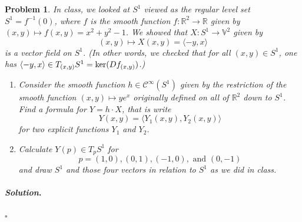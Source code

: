 \documentclass[reqno]{amsart}
\theoremstyle{plain}
\newtheorem{problem}{Problem}
\theoremstyle{definition}
\newenvironment{solution}{\paragraph{\emph{Solution}.}}{\hfill$\square$}
\begin{document}
\begin{problem}
In class, we looked at $S^{1}$ viewed as the regular level set $S^{1} = f^{-1}(0)$, where $f$ is the smooth function $f:\mathbb{R}^{2} \rightarrow \mathbb{R}$ given by $(x,y) \mapsto f(x,y) = x^{2} + y^{2}  - 1$.  We showed that $X:S^{1} \rightarrow \mathbb{V}^{2}$ given by
$$(x,y) \mapsto X(x,y) = \langle -y, x \rangle $$
is a vector field on $S^{1}$.  (In other words, we checked that for all $(x,y) \in S^{1}$, one has $\langle -y,x \rangle \in T_{(x,y)}S^{1} = {\rm ker}( Df_{(x,y)})$.)
\begin{enumerate}
\item Consider the smooth function $h \in \mathcal{C}^{\infty}(S^{1})$ given by the restriction of the smooth function $(x,y) \mapsto ye^{x}$ originally defined on all of $\mathbb{R}^2$ down to $S^{1}$.  Find a formula for $Y = h \cdot X$, that is write
$$Y(x,y) = \langle Y_{1}(x,y),Y_{2}(x,y)\rangle $$
for two explicit functions $Y_{1}$ and $Y_{2}$.
\item Calculate $Y(p) \in T_{p}S^{1}$ for 
$$p = (1,0), (0,1), (-1,0), \text{ and } (0,-1) $$
and draw $S^{1}$ and those four vectors in relation to $S^{1}$ as we did in class.
\end{enumerate}
\end{problem}
\begin{solution}

\end{solution}
\end{document}
